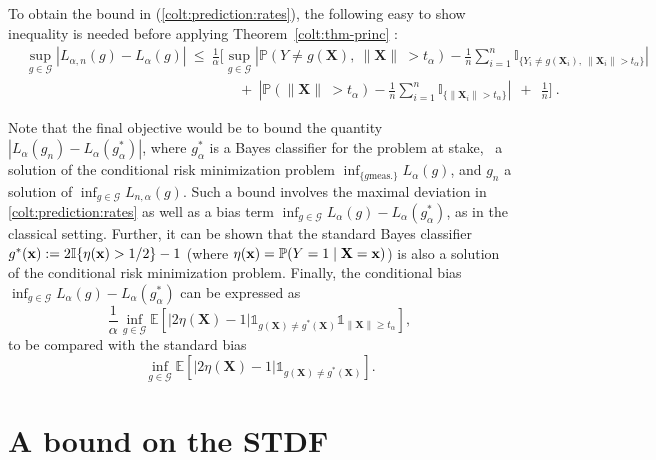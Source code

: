 \begin{remark}
\label{rk:classif-details}
To obtain the bound in (\ref{colt:prediction:rates}), the following easy to show inequality is needed before  applying Theorem~\ref{colt:thm-princ} :
\begin{align*}
&\sup_{g\in \mathcal{G}}| {L}_{\alpha, n}(g)- L_{\alpha}(g)  | ~ \le ~ \frac{1}{\alpha} \Bigg[ \sup_{g\in \mathcal{G}} \left| \mathbb{P} \left(Y\neq g(\mathbf{X}),~ \| \mathbf{X}\|\ >t_\alpha \right) - \frac{1}{n}\sum_{i=1}^n\mathds{I}_{\{Y_i\neq
   g(\mathbf{X}_i),~ \| \mathbf{X}_i\| > t_\alpha \}} \right| \\
&~~~~~~~~~~~~~~~~~~~~~~~~~~~~~~~~~~~~~~~~~~~~~~~~~~~~~~~~~~~~~~~~~~~~~+~ \left| \mathbb{P} \left(\| \mathbf{X}\|\ >t_\alpha \right) - \frac{1}{n}\sum_{i=1}^n\mathds{I}_{\{ \| \mathbf{X}_i\| > t_\alpha  \}} \right| ~~+~~ \frac{1}{n}  \Bigg] ~.
\end{align*}


Note that the final objective would be to bound the quantity 
$| {L}_{\alpha}(g_n)- L_{\alpha}(g^*_\alpha)  |$,
where $g^*_\alpha$ is a Bayes classifier for the problem at stake,
\ie~a  solution of the conditional risk  minimization problem  $\inf_{\{ g \text{
    meas.}\}} L_\alpha(g)$, and $g_n$ a solution of $\inf_{g \in \mathcal{G}}L_{n,\alpha}(g)$. 
Such a bound involves the maximal deviation in \eqref{colt:prediction:rates} as well as a  bias term $ \inf_{g\in
    \mathcal{G}}L_\alpha(g)-L_\alpha(g_\alpha^*)$, as in the classical
  setting. Further, it  can  be shown that the standard Bayes classifier
  $g^*(\mathbf x) := 2\mathbb{I}\{\eta(\mathbf{x})>1/2\}-1$ (where $\eta(\mathbf
  x) =
  \mathbb{P}(Y=1\; |\; \mathbf X=\mathbf x)$) is also   a solution of the conditional
  risk minimization problem. 
 Finally,  the conditional bias
 $ \inf_{g\in \mathcal{G}}L_\alpha(g)-L_\alpha(g_\alpha^*)$ can
 be expressed as
$$\frac{1}{\alpha}\inf_{g \in \mathcal{G}} \mathbb{E} \left [ |2
  \eta(\mathbf{X})-1|\mathds{1}_{g(\mathbf{X}) \neq g^*(\mathbf{X})
  }\mathds{1}_{ \|\mathbf{X}\| \ge t_\alpha}\right], $$ to be compared
with the standard bias $$\inf_{g \in \mathcal{G}} \mathbb{E} \left [ |2
  \eta(\mathbf{X})-1|\mathds{1}_{g(\mathbf{X}) \neq g^*(\mathbf{X})
  }\right].$$

\end{remark}



\section{A bound on the STDF}
\label{colt:sec:stdf}


